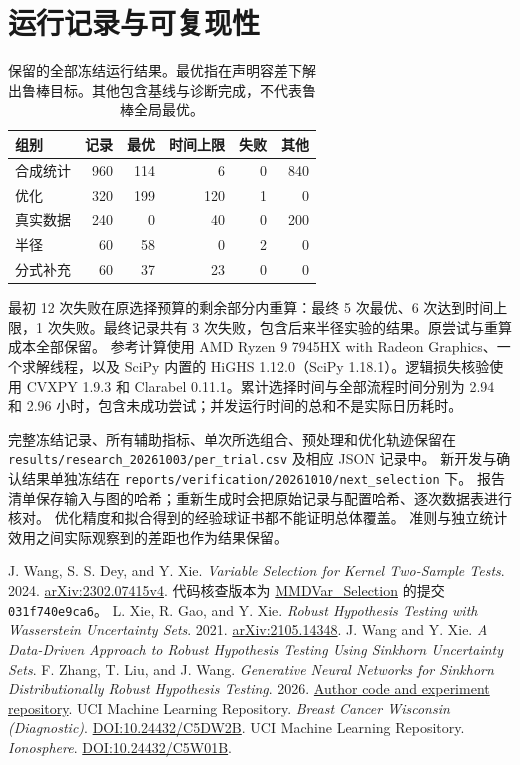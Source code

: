 \documentclass[11pt,a4paper]{article}
\begin{document}
\section{运行记录与可复现性}\label{sec:records}
\begin{table}[htbp]\centering\small\setlength{\tabcolsep}{3.5pt}
\caption{保留的全部冻结运行结果。最优指在声明容差下解出鲁棒目标。其他包含基线与诊断完成，不代表鲁棒全局最优。}\label{tab:outcomes}
\begin{tabularx}{\linewidth}{@{}Yrrrrr@{}}
\toprule 组别 & 记录 & 最优 & 时间上限 & 失败 & 其他 \\
\midrule
合成统计 & 960 & 114 & 6 & 0 & 840 \\
优化 & 320 & 199 & 120 & 1 & 0 \\
真实数据 & 240 & 0 & 40 & 0 & 200 \\
半径 & 60 & 58 & 0 & 2 & 0 \\
分式补充 & 60 & 37 & 23 & 0 & 0 \\
\bottomrule\end{tabularx}\end{table}
最初 12 次失败在原选择预算的剩余部分内重算：最终 5 次最优、6 次达到时间上限，1 次失败。最终记录共有 3 次失败，包含后来半径实验的结果。原尝试与重算成本全部保留。
参考计算使用 AMD Ryzen 9 7945HX with Radeon Graphics、一个求解线程，以及 SciPy 内置的 HiGHS 1.12.0（SciPy 1.18.1）。逻辑损失核验使用 CVXPY 1.9.3 和 Clarabel 0.11.1。累计选择时间与全部流程时间分别为 2.94 和 2.96 小时，包含未成功尝试；并发运行时间的总和不是实际日历耗时。


完整冻结记录、所有辅助指标、单次所选组合、预处理和优化轨迹保留在
\texttt{results/research\_20261003/per\_trial.csv} 及相应 JSON 记录中。
新开发与确认结果单独冻结在 \texttt{reports/verification/20261010/next\_selection} 下。
报告清单保存输入与图的哈希；重新生成时会把原始记录与配置哈希、逐次数据表进行核对。
优化精度和拟合得到的经验球证书都不能证明总体覆盖。
准则与独立统计效用之间实际观察到的差距也作为结果保留。

\FloatBarrier
\begin{thebibliography}{9}
 J. Wang, S. S. Dey, and Y. Xie.
\emph{Variable Selection for Kernel Two-Sample Tests}. 2024.
\href{https://arxiv.org/abs/2302.07415}{arXiv:2302.07415v4}.
代码核查版本为
\href{https://github.com/WalterBabyRudin/MMDVar_Selection}{MMDVar\_Selection}
的提交 \texttt{031f740e9ca6}。
 L. Xie, R. Gao, and Y. Xie.
\emph{Robust Hypothesis Testing with Wasserstein Uncertainty Sets}. 2021.
\href{https://arxiv.org/abs/2105.14348}{arXiv:2105.14348}.
 J. Wang and Y. Xie.
\emph{A Data-Driven Approach to Robust Hypothesis Testing Using Sinkhorn Uncertainty Sets}.
 F. Zhang, T. Liu, and J. Wang.
\emph{Generative Neural Networks for Sinkhorn Distributionally Robust Hypothesis Testing}. 2026.
\href{https://github.com/Arthas819/SDRHT}{Author code and experiment repository}.
 UCI Machine Learning Repository.
\emph{Breast Cancer Wisconsin (Diagnostic)}. \href{https://doi.org/10.24432/C5DW2B}{DOI:10.24432/C5DW2B}.
 UCI Machine Learning Repository.
\emph{Ionosphere}. \href{https://doi.org/10.24432/C5W01B}{DOI:10.24432/C5W01B}.
\end{thebibliography}
\end{document}
